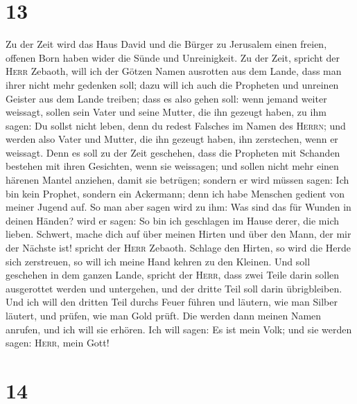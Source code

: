 \hypertarget{section-12}{%
\section{13}\label{section-12}}

 Zu der Zeit wird das Haus David und die Bürger zu
Jerusalem einen freien, offenen Born haben wider die Sünde und
Unreinigkeit.  Zu der Zeit, spricht der \textsc{Herr}
Zebaoth, will ich der Götzen Namen ausrotten aus dem Lande, dass man
ihrer nicht mehr gedenken soll; dazu will ich auch die Propheten und
unreinen Geister aus dem Lande treiben;  dass es also
gehen soll: wenn jemand weiter weissagt, sollen sein Vater und seine
Mutter, die ihn gezeugt haben, zu ihm sagen: Du sollst nicht leben, denn
du redest Falsches im Namen des \textsc{Herrn}; und werden also Vater
und Mutter, die ihn gezeugt haben, ihn zerstechen, wenn er weissagt.
 Denn es soll zu der Zeit geschehen, dass die Propheten
mit Schanden bestehen mit ihren Gesichten, wenn sie weissagen; und
sollen nicht mehr einen härenen Mantel anziehen, damit sie betrügen;
 sondern er wird müssen sagen: Ich bin kein Prophet,
sondern ein Ackermann; denn ich habe Menschen gedient von meiner Jugend
auf.  So man aber sagen wird zu ihm: Was sind das für
Wunden in deinen Händen? wird er sagen: So bin ich geschlagen im Hause
derer, die mich lieben.  Schwert, mache dich auf über
meinen Hirten und über den Mann, der mir der Nächste ist! spricht der
\textsc{Herr} Zebaoth. Schlage den Hirten, so wird die Herde sich
zerstreuen, so will ich meine Hand kehren zu den Kleinen. 
Und soll geschehen in dem ganzen Lande, spricht der \textsc{Herr}, dass
zwei Teile darin sollen ausgerottet werden und untergehen, und der
dritte Teil soll darin übrigbleiben.  Und ich will den
dritten Teil durchs Feuer führen und läutern, wie man Silber läutert,
und prüfen, wie man Gold prüft. Die werden dann meinen Namen anrufen,
und ich will sie erhören. Ich will sagen: Es ist mein Volk; und sie
werden sagen: \textsc{Herr}, mein Gott!

\hypertarget{section-13}{%
\section{14}\label{section-13}}

